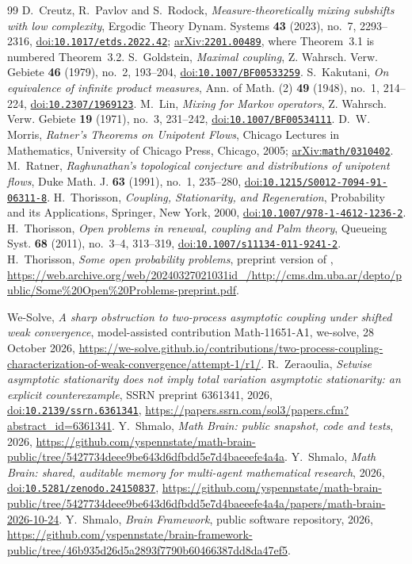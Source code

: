 \documentclass[11pt]{amsart}
\theoremstyle{definition}
\theoremstyle{remark}
\newcommand{\doi}[1]{\href{https://doi.org/#1}{doi:\nolinkurl{#1}}}
\newcommand{\arxiv}[1]{\href{https://arxiv.org/abs/#1}{arXiv:\nolinkurl{#1}}}
\begin{document}
\begin{thebibliography}{99}
 D.~Creutz, R.~Pavlov and S.~Rodock, \emph{Measure-theoretically mixing subshifts with low complexity},
Ergodic Theory Dynam. Systems \textbf{43} (2023), no.~7, 2293--2316, \doi{10.1017/etds.2022.42}; \arxiv{2201.00489}, where Theorem~3.1 is numbered Theorem~3.2.
 S.~Goldstein, \emph{Maximal coupling}, Z. Wahrsch. Verw. Gebiete \textbf{46} (1979), no.~2, 193--204,
\doi{10.1007/BF00533259}.
 S.~Kakutani, \emph{On equivalence of infinite product measures}, Ann. of Math. (2) \textbf{49} (1948),
no.~1, 214--224, \doi{10.2307/1969123}.
 M.~Lin, \emph{Mixing for Markov operators}, Z. Wahrsch. Verw. Gebiete \textbf{19} (1971), no.~3,
231--242, \doi{10.1007/BF00534111}.
 D.~W. Morris, \emph{Ratner's Theorems on Unipotent Flows}, Chicago Lectures in Mathematics, University
of Chicago Press, Chicago, 2005; \arxiv{math/0310402}.
 M.~Ratner, \emph{Raghunathan's topological conjecture and distributions of unipotent flows}, Duke Math.
J. \textbf{63} (1991), no.~1, 235--280, \doi{10.1215/S0012-7094-91-06311-8}.
 H.~Thorisson, \emph{Coupling, Stationarity, and Regeneration}, Probability and its Applications,
Springer, New York, 2000, \doi{10.1007/978-1-4612-1236-2}.
 H.~Thorisson, \emph{Open problems in renewal, coupling and Palm theory}, Queueing Syst. \textbf{68}
(2011), no.~3--4, 313--319, \doi{10.1007/s11134-011-9241-2}.
 H.~Thorisson, \emph{Some open probability problems}, preprint version of \cite{Tho11},
\url{https://web.archive.org/web/20240327021031id_/http://cms.dm.uba.ar/depto/public/Some\%20Open\%20Problems-preprint.pdf}.

 We-Solve, \emph{A sharp obstruction to two-process asymptotic coupling under shifted weak convergence},
model-assisted contribution Math-11651-A1, we-solve, 28 October 2026,
\url{https://we-solve.github.io/contributions/two-process-coupling-characterization-of-weak-convergence/attempt-1/r1/}.
 R.~Zeraoulia, \emph{Setwise asymptotic stationarity does not imply total variation asymptotic
stationarity: an explicit counterexample}, SSRN preprint 6361341, 2026, \doi{10.2139/ssrn.6361341},
\url{https://papers.ssrn.com/sol3/papers.cfm?abstract_id=6361341}.
 Y.~Shmalo, \emph{Math Brain: public snapshot, code and tests}, 2026,
\url{https://github.com/yspennstate/math-brain-public/tree/5427734deee9be643d6dfbdd5e7d4baeeefe4a4a}.
 Y.~Shmalo, \emph{Math Brain: shared, auditable memory for multi-agent mathematical
research}, 2026, \doi{10.5281/zenodo.24150837},
\url{https://github.com/yspennstate/math-brain-public/tree/5427734deee9be643d6dfbdd5e7d4baeeefe4a4a/papers/math-brain-2026-10-24}.
 Y.~Shmalo, \emph{Brain Framework}, public software repository, 2026,
\url{https://github.com/yspennstate/brain-framework-public/tree/46b935d26d5a2893f7790b60466387dd8da47ef5}.
\end{thebibliography}
\end{document}
